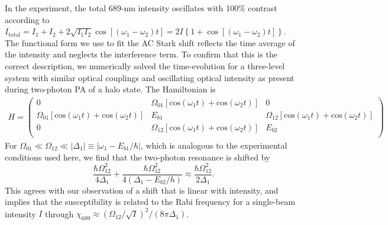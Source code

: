 In the experiment, the total 689-nm intensity oscillates with 100\% contrast according to $I_{\text{total}}=I_1+I_2+2\sqrt{I_1I_2}\cos \left[(\omega_1-\omega_2)t \right]=2I\left\{1+\cos \left[(\omega_1-\omega_2)t \right]\right\}$. The functional form we use to fit the AC Stark shift reflects the time average of the intensity and neglects the interference term. To confirm that this is the correct description, we numerically solved the time-evolution for a three-level system with similar optical couplings and oscillating optical intensity as present during two-photon PA of a halo state. The Hamiltonian is
\begin{eqnarray}\label{Eq:ThreeLevelHamiltonian}
H=
\left(
    \begin{array}{ccc}
      0 & \Omega_{01}\left[\mathrm{cos}(\omega_1 t)+ \mathrm{cos}(\omega_2 t)\right] & 0 \\
      \Omega_{01}\left[\mathrm{cos}(\omega_1 t)+ \mathrm{cos}(\omega_2 t)\right] & E_{b1} & \Omega_{12}\left[\mathrm{cos}(\omega_1 t)+ \mathrm{cos}(\omega_2 t)\right] \\
      0 & \Omega_{12}\left[\mathrm{cos}(\omega_1 t)+ \mathrm{cos}(\omega_2 t)\right] & E_{b2} \\
    \end{array}
  \right)
\nonumber
\end{eqnarray}
For $\Omega_{01}\ll \Omega_{12} \ll |\Delta_{1}|\equiv |\omega_1-E_{b1}/\hbar|$, which is analogous to the experimental conditions used here, we find that the two-photon resonance is shifted by
\begin{equation}\label{Eq:ACStarkFullModel}
\frac{\hbar\Omega_{12}^{2}}{4\Delta_{1}}+\frac{\hbar\Omega_{12}^{2}}{4\left(\Delta_{1}-E_{b2}/h\right)}\approx
\frac{\hbar\Omega_{12}^{2}}{2\Delta_{1}}.
\end{equation}
This agrees with our observation of a shift that is linear with intensity, and implies that the susceptibility is related to the Rabi frequency for a single-beam intensity $I$ through $\chi_{689}\approx(\Omega_{12}/\sqrt{I})^2/(8\pi \Delta_1)$.




